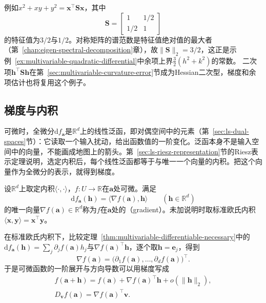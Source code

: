 例如$x^2+xy+y^2=\bm x^\top\bm S\bm x$，其中
\[
 \bm S=\begin{bmatrix}1&1/2\\1/2&1\end{bmatrix}
\]
的特征值为$3/2$与$1/2$。对称矩阵的谱范数是特征值绝对值的最大者（第~\ref{chap:eigen-spectral-decomposition}章），故$\lVert\bm S\rVert_2=3/2$，这正是示例~\ref{ex:multivariable-quadratic-differential}中余项上界$\tfrac32(h^2+k^2)$的常数。
二次项$\bm h^\top\bm S\bm h$在第~\ref{sec:multivariable-curvature-error}节成为Hessian二次型，梯度和余项估计也将复用这个例子。

\subsection{梯度与内积}
\label{sec:multivariable-gradient-inner-product}

可微时，全微分$\mathrm df_{\bm a}$是$\mathbb R^d$上的线性泛函，即对偶空间中的元素（第~\ref{sec:ls-dual-spaces}节）：它读取一个输入扰动，给出函数值的一阶变化。泛函本身不是输入空间中的向量，不能画成地图上的箭头。第~\ref{sec:ls-riesz-representation}节的Riesz表示定理说明，选定内积后，每个线性泛函都等于与唯一一个向量的内积。把这个向量作为全微分的表示，就得到梯度。
\begin{definition}[梯度]
\label{def:multivariable-gradient}
设$\mathbb R^d$上取定内积$\langle\cdot,\cdot\rangle$，$f:U\to\mathbb R$在$\bm a$处可微。满足
\begin{equation}
 \mathrm df_{\bm a}(\bm h)=\langle\nabla f(\bm a),\bm h\rangle\qquad(\bm h\in\mathbb R^d)
\label{eq:multivariable-gradient-definition}
\end{equation}
的唯一向量$\nabla f(\bm a)\in\mathbb R^d$称为$f$在$\bm a$处的（gradient）。未加说明时取标准欧氏内积$\langle\bm x,\bm y\rangle=\bm x^\top\bm y$。
\end{definition}
在标准欧氏内积下，比较定理~\ref{thm:multivariable-differentiable-necessary}中的$\mathrm df_{\bm a}(\bm h)=\sum_j\partial_jf(\bm a)h_j$与$\nabla f(\bm a)^\top\bm h$，逐个取$\bm h=\bm e_j$，得到
\begin{equation}
 \nabla f(\bm a)=\bigl(\partial_1f(\bm a),\ldots,\partial_df(\bm a)\bigr)^\top .
\label{eq:multivariable-gradient-coordinates}
\end{equation}
于是可微函数的一阶展开与方向导数可以用梯度写成
\[
 \begin{gathered}
 f(\bm a+\bm h)=f(\bm a)+\nabla f(\bm a)^\top\bm h+o(\lVert\bm h\rVert_2),\\
 D_{\bm v}f(\bm a)=\nabla f(\bm a)^\top\bm v.
 \end{gathered}
\]

